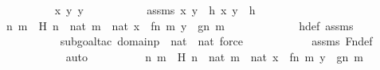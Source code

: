 \begin{isabellebody}
\ \ \ \ \ \ \ \ \isamarkupfalse%
\ x\ y\ y{\isacharprime}{\kern0pt}\ \isanewline
\ \ \ \ \ \ \ \ \isamarkupfalse%
\ assms{}{\isacharcolon}{\kern0pt}\ {\isachardoublequoteopen}{\isacharless}{\kern0pt}x{\isacharcomma}{\kern0pt}\ y{\isachargreater}{\kern0pt}\ {\isasymin}\ h{\isachardoublequoteclose}\ {\isachardoublequoteopen}{\isacharless}{\kern0pt}x{\isacharcomma}{\kern0pt}\ y{\isacharprime}{\kern0pt}{\isachargreater}{\kern0pt}\ {\isasymin}\ h{\isachardoublequoteclose}\ \isanewline
\ \ \ \ \ \ \ \ \isamarkupfalse%
\ n\ m\ \ H{\isacharcolon}{\kern0pt}\ {\isachardoublequoteopen}n\ {\isasymin}\ nat{\isachardoublequoteclose}\ {\isachardoublequoteopen}m\ {\isasymin}\ nat{\isachardoublequoteclose}\ {\isachardoublequoteopen}x\ {\isacharequal}{\kern0pt}\ {\isacharless}{\kern0pt}f{\isacharbackquote}{\kern0pt}n{\isacharcomma}{\kern0pt}\ m{\isachargreater}{\kern0pt}{\isachardoublequoteclose}\ {\isachardoublequoteopen}y\ {\isacharequal}{\kern0pt}\ g{\isacharbackquote}{\kern0pt}{\isacharless}{\kern0pt}n{\isacharcomma}{\kern0pt}\ m{\isachargreater}{\kern0pt}{\isachardoublequoteclose}\ \isanewline
\ \ \ \ \ \ \ \ \ \ \isamarkupfalse%
\ h{\isacharunderscore}{\kern0pt}def\ assms{}\ \isanewline
\ \ \ \ \ \ \ \ \ \ \isamarkupfalse%
{\isacharparenleft}{\kern0pt}subgoal{\isacharunderscore}{\kern0pt}tac\ {\isachardoublequoteopen}domain{\isacharparenleft}{\kern0pt}p{\isacharparenright}{\kern0pt}\ {\isasymsubseteq}\ nat\ {\isasymtimes}\ nat{\isachardoublequoteclose}{\isacharcomma}{\kern0pt}\ force{\isacharparenright}{\kern0pt}\isanewline
\ \ \ \ \ \ \ \ \ \ \isamarkupfalse%
\ assms\ Fn{\isacharunderscore}{\kern0pt}def\ \isanewline
\ \ \ \ \ \ \ \ \ \ \isamarkupfalse%
\ auto\isanewline
\ \ \ \ \ \ \ \ \isamarkupfalse%
\ n{\isacharprime}{\kern0pt}\ m{\isacharprime}{\kern0pt}\ \ H{\isacharprime}{\kern0pt}{\isacharcolon}{\kern0pt}\ {\isachardoublequoteopen}n{\isacharprime}{\kern0pt}\ {\isasymin}\ nat{\isachardoublequoteclose}\ {\isachardoublequoteopen}m{\isacharprime}{\kern0pt}\ {\isasymin}\ nat{\isachardoublequoteclose}\ {\isachardoublequoteopen}x\ {\isacharequal}{\kern0pt}\ {\isacharless}{\kern0pt}f{\isacharbackquote}{\kern0pt}n{\isacharprime}{\kern0pt}{\isacharcomma}{\kern0pt}\ m{\isacharprime}{\kern0pt}{\isachargreater}{\kern0pt}{\isachardoublequoteclose}\ {\isachardoublequoteopen}y{\isacharprime}{\kern0pt}\ {\isacharequal}{\kern0pt}\ g{\isacharbackquote}{\kern0pt}{\isacharless}{\kern0pt}n{\isacharprime}{\kern0pt}{\isacharcomma}{\kern0pt}\ m{\isacharprime}{\kern0pt}{\isachargreater}{\kern0pt}{\isachardoublequoteclose}\isanewline

\end{isabellebody}
